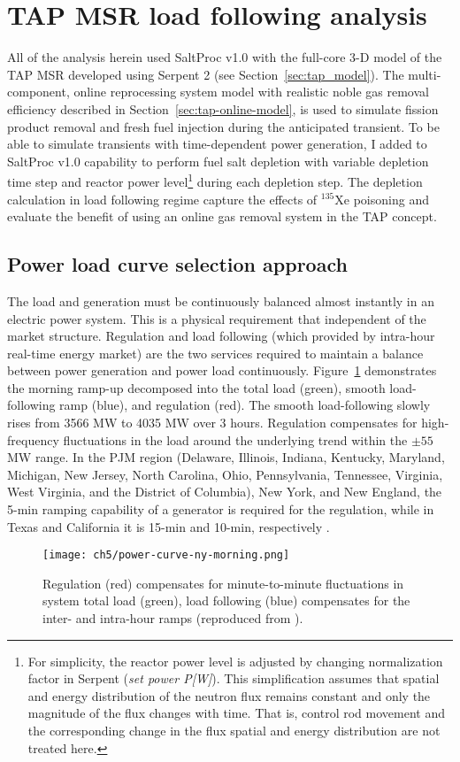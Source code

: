 \section{TAP MSR load following analysis}
All of the analysis herein used SaltProc v1.0 with the full-core 3-D model of 
the \gls{TAP} \gls{MSR} developed using Serpent 2 (see 
Section~\ref{sec:tap_model}). The multi-component, online reprocessing system 
model with realistic noble gas removal efficiency described in 
Section~\ref{sec:tap-online-model}, is used to simulate fission product 
removal 
and fresh fuel injection during the anticipated transient. To be able to 
simulate transients with time-dependent power generation, I added to SaltProc 
v1.0 capability to perform fuel salt depletion with variable depletion time 
step and reactor power level\footnote{For simplicity, the reactor power level 
is adjusted by changing normalization factor in Serpent (\emph{set power 
P[W]}). This simplification assumes that spatial and energy distribution of 
the neutron flux remains constant and only the magnitude of the flux changes 
with time. That is, control rod movement and the corresponding change in the 
flux spatial and energy distribution are not treated here.} during each 
depletion step. The depletion calculation in load following regime capture the 
effects of $^{135}$Xe poisoning and evaluate the benefit of using an online 
gas removal system in the \gls{TAP} concept.

\subsection{Power load curve selection approach}\label{sec:worst-load}
The load and generation must be continuously balanced almost instantly  in an 
electric power system. This is a physical requirement that independent of the 
market structure. Regulation and load following (which provided by intra-hour 
real-time energy market) are the two services required to maintain a balance 
between power generation and power load continuously. 
Figure~\ref*{fig:power-curve-ny} demonstrates the morning ramp-up decomposed 
into the total load (green), smooth load-following ramp (blue), and regulation 
(red). The smooth load-following slowly rises from 3566 MW to 4035 MW over 3 
hours. Regulation compensates for high-frequency fluctuations in the load 
around the underlying trend within the $\pm55$MW range. In the PJM region 
(Delaware, Illinois, Indiana, Kentucky, Maryland, Michigan, New Jersey, North 
Carolina, Ohio, Pennsylvania, Tennessee, Virginia, West Virginia, and the 
District of Columbia), New York, and New England, the 5-min ramping capability 
of a generator is required for the regulation, while in Texas and California 
it is 15-min and 10-min, respectively \cite{kirby_method_2005}.
\begin{figure}[htp!] %
	\centering
	\texttt{[image: ch5/power-curve-ny-morning.png]}
	\caption{Regulation (red) compensates for minute-to-minute fluctuations in 
	system total load (green), load following (blue) compensates for the 
	inter- and intra-hour ramps (reproduced from \cite{kirby_method_2005}).}
	\label{fig:power-curve-ny}
\end{figure}

